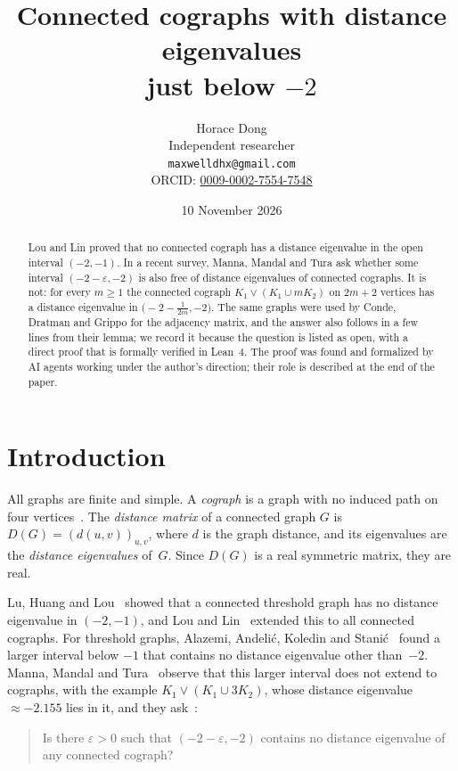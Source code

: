 \documentclass[11pt]{article}
\title{Connected cographs with distance eigenvalues\\ just below $-2$}
\author{Horace Dong\\ \small Independent researcher\\
\small\texttt{maxwelldhx@gmail.com}\\
\small ORCID: \href{https://orcid.org/0009-0002-7554-7548}{0009-0002-7554-7548}}
\date{10 November 2026}
\theoremstyle{remark}
\begin{document}
\maketitle

\begin{abstract}
Lou and Lin proved that no connected cograph has a distance eigenvalue in the
open interval $(-2,-1)$. In a recent survey, Manna, Mandal and Tura ask whether
some interval $(-2-\varepsilon,-2)$ is also free of distance eigenvalues of
connected cographs. It is not: for every $m\ge1$ the connected cograph
$K_1\vee(K_1\cup mK_2)$ on $2m+2$ vertices has a distance eigenvalue in
$\bigl(-2-\frac1{2m},-2\bigr)$. The same graphs were used by Conde, Dratman
and Grippo for the adjacency matrix, and the answer also follows in a few lines
from their lemma; we record it because the question is listed as open, with a
direct proof that is formally verified in Lean~4. The proof was found and
formalized by AI agents working under the author's direction; their role is
described at the end of the paper.
\end{abstract}

\section{Introduction}

All graphs are finite and simple. A \emph{cograph} is a graph with no induced
path on four vertices~\cite{cls}. The \emph{distance matrix} of a connected
graph $G$ is $D(G)=(d(u,v))_{u,v}$, where $d$ is the graph distance, and its
eigenvalues are the \emph{distance eigenvalues} of~$G$. Since $D(G)$ is a real
symmetric matrix, they are real.

Lu, Huang and Lou~\cite{lhl} showed that a connected threshold graph has no
distance eigenvalue in $(-2,-1)$, and Lou and Lin~\cite{ll} extended this to
all connected cographs. For threshold graphs, Alazemi, Andeli\'c, Koledin and
Stani\'c~\cite{aaks} found a larger interval below $-1$ that contains no
distance eigenvalue other than~$-2$. Manna, Mandal and Tura~\cite{mmt} observe
that this larger interval does not extend to cographs, with the example
$K_1\vee(K_1\cup3K_2)$, whose distance eigenvalue $\approx-2.155$ lies in it,
and they ask~\cite[Open Problem ``Distance eigenvalues of cographs below $-2$
and sharpness'', part~(i)]{mmt}:
\begin{quote}
Is there $\varepsilon>0$ such that $(-2-\varepsilon,-2)$ contains no distance
eigenvalue of any connected cograph?
\end{quote}
\end{document}
